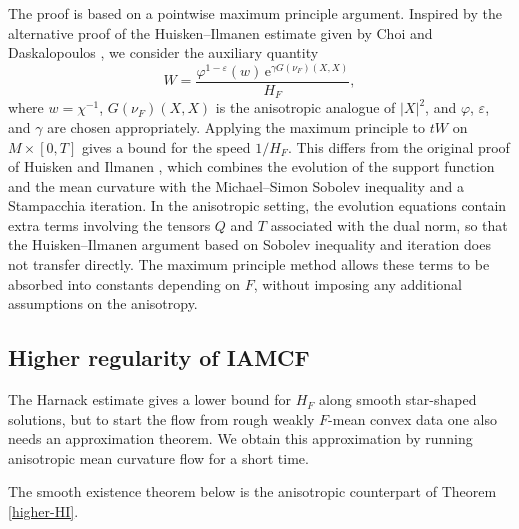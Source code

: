 \documentclass[11pt,reqno]{amsart}
\theoremstyle{definition}
\theoremstyle{remark}
\numberwithin{equation}{section}
\begin{document}
	The proof is based on a pointwise maximum principle argument. Inspired by the alternative proof of the Huisken--Ilmanen estimate given by Choi and Daskalopoulos \cite[Theorem A.5]{CD21}, we consider the auxiliary quantity
	\begin{equation*}
		W = \frac{\varphi^{1-\varepsilon}(w)\,\mathrm{e}^{\gamma G(\nu_F)(X,X)}}{H_F},
	\end{equation*}
	where $w=\chi^{-1}$, $G(\nu_F)(X,X)$ is the anisotropic analogue of $|X|^2$, and $\varphi$, $\varepsilon$, and $\gamma$ are chosen appropriately. Applying the maximum principle to $tW$ on $M\times[0,T]$ gives a bound for the speed $1/H_F$. This differs from the original proof of Huisken and Ilmanen \cite{HI08}, which combines the evolution of the support function and the mean curvature with the Michael--Simon Sobolev inequality and a Stampacchia iteration. In the anisotropic setting, the evolution equations contain extra terms involving the tensors $Q$ and $T$ associated with the dual norm, so that the Huisken--Ilmanen argument based on Sobolev inequality and iteration does not transfer directly. The maximum principle method allows these terms to be absorbed into constants depending on $F$, without imposing any additional assumptions on the anisotropy.

	\subsection{Higher regularity of IAMCF}
	\label{subsec:higher-regularity-intro}
	The Harnack estimate gives a lower bound for $H_F$ along smooth star-shaped solutions, but to start the flow from rough weakly $F$-mean convex data one also needs an approximation theorem. We obtain this approximation by running anisotropic mean curvature flow for a short time. 
    

	The smooth existence theorem below is the anisotropic counterpart of Theorem \ref{higher-HI}.
	
\end{document}
